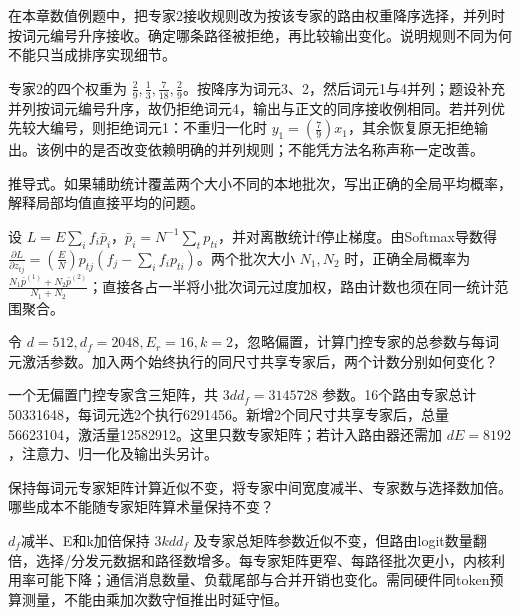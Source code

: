 \begin{exercises}
\begin{exercise}\optional 在本章数值例题中，把专家2接收规则改为按该专家的路由权重降序选择，并列时按词元编号升序接收。确定哪条路径被拒绝，再比较输出变化。说明规则不同为何不能只当成排序实现细节。

\begin{solution}
专家2的四个权重为 $\frac{2}{9},\frac{1}{3},\frac{7}{18},\frac{2}{9}$。按降序为词元3、2，然后词元1与4并列；题设补充并列按词元编号升序，故仍拒绝词元4，输出与正文的同序接收例相同。若并列优先较大编号，则拒绝词元1：不重归一化时 $y_1=(\frac{7}{9})x_1$，其余恢复原无拒绝输出。该例中的是否改变依赖明确的并列规则；不能凭方法名称声称一定改善。
\end{solution}
\end{exercise}

\begin{exercise} 推导式。如果辅助统计覆盖两个大小不同的本地批次，写出正确的全局平均概率，解释局部均值直接平均的问题。

\begin{solution}
设 $L=E\sum_if_i\bar p_i$，$\bar p_i=N^{-1}\sum_tp_{ti}$，并对离散统计f停止梯度。由Softmax导数得 $\frac{\partial L}{\partial z_{tj}}=(\frac{E}{N})p_{tj}(f_j-\sum_if_ip_{ti})$。两个批次大小 $N_1,N_2$ 时，正确全局概率为 $\frac{N_1\bar p^{(1)}+N_2\bar p^{(2)}}{N_1+N_2}$；直接各占一半将小批次词元过度加权，路由计数也须在同一统计范围聚合。
\end{solution}
\end{exercise}

\begin{exercise} 令 $d=512,d_f=2048,E_r=16,k=2$，忽略偏置，计算门控专家的总参数与每词元激活参数。加入两个始终执行的同尺寸共享专家后，两个计数分别如何变化？

\begin{solution}
一个无偏置门控专家含三矩阵，共 $3dd_f=3145728$ 参数。16个路由专家总计50331648，每词元选2个执行6291456。新增2个同尺寸共享专家后，总量56623104，激活量12582912。这里只数专家矩阵；若计入路由器还需加 $dE=8192$，注意力、归一化及输出头另计。
\end{solution}
\end{exercise}

\begin{exercise}\optional 保持每词元专家矩阵计算近似不变，将专家中间宽度减半、专家数与选择数加倍。哪些成本不能随专家矩阵算术量保持不变？

\begin{solution}
$d_f$减半、E和k加倍保持 $3kdd_f$ 及专家总矩阵参数近似不变，但路由logit数量翻倍，选择/分发元数据和路径数增多。每专家矩阵更窄、每路径批次更小，内核利用率可能下降；通信消息数量、负载尾部与合并开销也变化。需同硬件同token预算测量，不能由乘加次数守恒推出时延守恒。
\end{solution}
\end{exercise}


\end{exercises}
